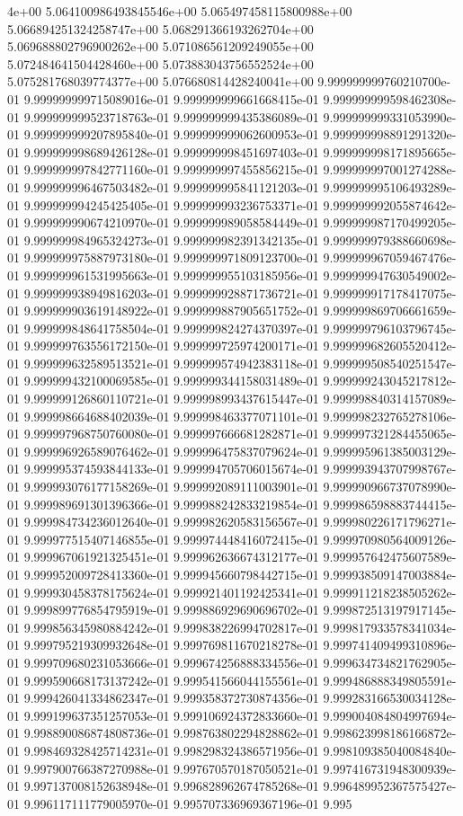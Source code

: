 4e+00	5.064100986493845546e+00	5.065497458115800988e+00	5.066894251324258747e+00	5.068291366193262704e+00	5.069688802796900262e+00	5.071086561209249055e+00	5.072484641504428460e+00	5.073883043756552524e+00	5.075281768039774377e+00	5.076680814428240041e+00
9.999999999760210700e-01	9.999999999715089016e-01	9.999999999661668415e-01	9.999999999598462308e-01	9.999999999523718763e-01	9.999999999435386089e-01	9.999999999331053990e-01	9.999999999207895840e-01	9.999999999062600953e-01	9.999999998891291320e-01	9.999999998689426128e-01	9.999999998451697403e-01	9.999999998171895665e-01	9.999999997842771160e-01	9.999999997455856215e-01	9.999999997001274288e-01	9.999999996467503482e-01	9.999999995841121203e-01	9.999999995106493289e-01	9.999999994245425405e-01	9.999999993236753371e-01	9.999999992055874642e-01	9.999999990674210970e-01	9.999999989058584449e-01	9.999999987170499205e-01	9.999999984965324273e-01	9.999999982391342135e-01	9.999999979388660698e-01	9.999999975887973180e-01	9.999999971809123700e-01	9.999999967059467476e-01	9.999999961531995663e-01	9.999999955103185956e-01	9.999999947630549002e-01	9.999999938949816203e-01	9.999999928871736721e-01	9.999999917178417075e-01	9.999999903619148922e-01	9.999999887905651752e-01	9.999999869706661659e-01	9.999999848641758504e-01	9.999999824274370397e-01	9.999999796103796745e-01	9.999999763556172150e-01	9.999999725974200171e-01	9.999999682605520412e-01	9.999999632589513521e-01	9.999999574942383118e-01	9.999999508540251547e-01	9.999999432100069585e-01	9.999999344158031489e-01	9.999999243045217812e-01	9.999999126860110721e-01	9.999998993437615447e-01	9.999998840314157089e-01	9.999998664688402039e-01	9.999998463377071101e-01	9.999998232765278106e-01	9.999997968750760080e-01	9.999997666681282871e-01	9.999997321284455065e-01	9.999996926589076462e-01	9.999996475837079624e-01	9.999995961385003129e-01	9.999995374593844133e-01	9.999994705706015674e-01	9.999993943707998767e-01	9.999993076177158269e-01	9.999992089111003901e-01	9.999990966737078990e-01	9.999989691301396366e-01	9.999988242833219854e-01	9.999986598883744415e-01	9.999984734236012640e-01	9.999982620583156567e-01	9.999980226171796271e-01	9.999977515407146855e-01	9.999974448416072415e-01	9.999970980564009126e-01	9.999967061921325451e-01	9.999962636674312177e-01	9.999957642475607589e-01	9.999952009728413360e-01	9.999945660798442715e-01	9.999938509147003884e-01	9.999930458378175624e-01	9.999921401192425341e-01	9.999911218238505262e-01	9.999899776854795919e-01	9.999886929690696702e-01	9.999872513197917145e-01	9.999856345980884242e-01	9.999838226994702817e-01	9.999817933578341034e-01	9.999795219309932648e-01	9.999769811670218278e-01	9.999741409499310896e-01	9.999709680231053666e-01	9.999674256888334556e-01	9.999634734821762905e-01	9.999590668173137242e-01	9.999541566044155561e-01	9.999486888349805591e-01	9.999426041334862347e-01	9.999358372730874356e-01	9.999283166530034128e-01	9.999199637351257053e-01	9.999106924372833660e-01	9.999004084804997694e-01	9.998890086874808736e-01	9.998763802294828862e-01	9.998623998186166872e-01	9.998469328425714231e-01	9.998298324386571956e-01	9.998109385040084840e-01	9.997900766387270988e-01	9.997670570187050521e-01	9.997416731948300939e-01	9.997137008152638948e-01	9.996828962674785268e-01	9.996489952367575427e-01	9.996117111779005970e-01	9.995707336969367196e-01	9.995